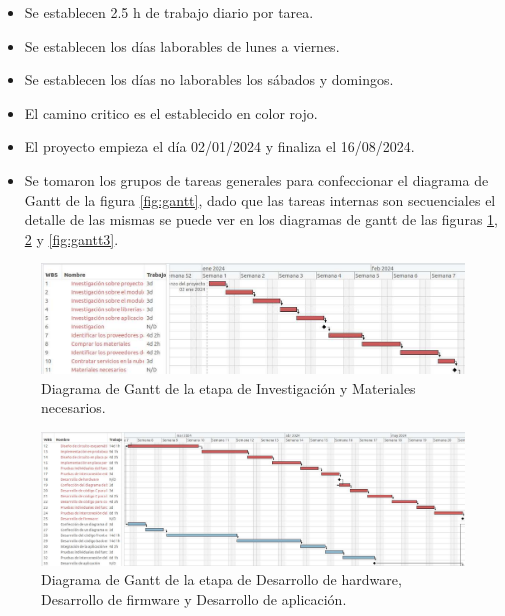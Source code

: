 \documentclass[
11pt, %
]{charter}
\begin{document}
\begin{itemize}
\item Se establecen  2.5 h de trabajo diario por tarea.
\item Se establecen  los días laborables de lunes a viernes.
\item Se establecen  los días no laborables los sábados y domingos.
\item El camino critico es el establecido en color rojo.
\item El proyecto empieza el día 02/01/2024 y finaliza el 16/08/2024.
\item Se tomaron los grupos de tareas generales para confeccionar el diagrama de Gantt de la figura \ref{fig:gantt}, dado que las tareas internas son secuenciales el detalle de las mismas se puede ver en los diagramas de gantt de las figuras \ref{fig:gantt1}, \ref{fig:gantt2} y \ref{fig:gantt3}.
\end{itemize}



\begin{figure}[htpb]
\centering 
\includegraphics[width=1.0\textwidth, height=.43 \textwidth]{./Figuras/ganttProyecto1.pdf}
\caption{Diagrama de Gantt de la etapa de Investigación y Materiales necesarios.}
\label{fig:gantt1}
\end{figure}


\begin{figure}[htpb]
\centering 
\includegraphics[width=1.0\textwidth, height=.43 \textwidth]{./Figuras/ganttProyecto2.pdf}
\caption{Diagrama de Gantt de la etapa de Desarrollo de hardware, Desarrollo de firmware y Desarrollo de aplicación.}
\label{fig:gantt2}
\end{figure}
\end{document}
